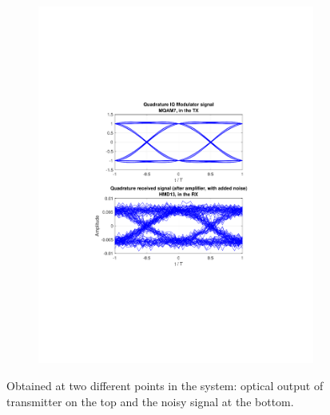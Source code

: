 \begin{refsection}
\begin{figure}[H]
\begin{minipage}{\linewidth}
\begin{subfigure}{.45\textwidth}
	\end{subfigure}
	\begin{subfigure}{.45\textwidth}
		\centering
		\includegraphics[clip, trim=4cm 7cm 4cm 7cm, 
		width=\textwidth]{./sdf/m_qam_system/figures/eyes/simulRc09Sp45Np60_q.pdf}
	\end{subfigure}
	
	\caption{
		Obtained
		at two different points in the system: optical output of transmitter on the top and
		the noisy signal at the bottom.
		\label{fig:eyes_n_rc_45_09}}
	\end{minipage}
\end{figure}
\begin{table}[H]
	\centering
	

\end{table}
\end{refsection}

